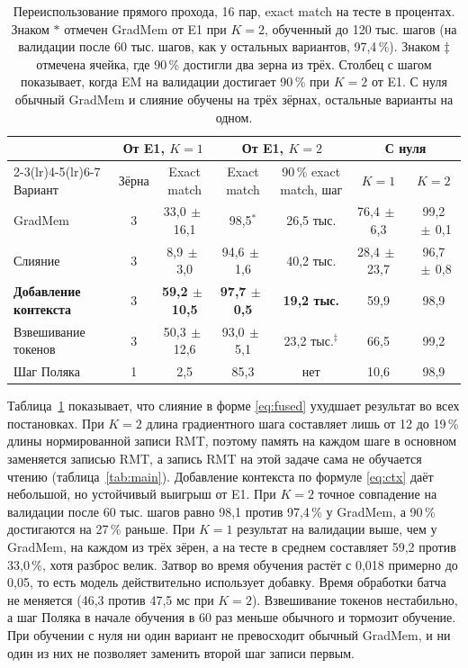 \documentclass[a4paper,11pt]{article}
\newcommand{\pmm}{\ensuremath{\,\pm\,}}
\begin{document}
\begin{table}[t]
\centering\footnotesize
\caption{Переиспользование прямого прохода, 16 пар, exact match на тесте в процентах. Знаком $\ast$ отмечен GradMem от E1 при $K=2$, обученный до 120 тыс. шагов (на валидации после 60 тыс. шагов, как у остальных вариантов, 97,4\,\%). Знаком $\ddagger$ отмечена ячейка, где 90\,\% достигли два зерна из трёх. Столбец с шагом показывает, когда EM на валидации достигает 90\,\% при $K=2$ от E1. С нуля обычный GradMem и слияние обучены на трёх зёрнах, остальные варианты на одном.}
\label{tab:fwd}
\begin{tabular}{l c c c c c c}
\toprule
& \multicolumn{2}{c}{От E1, $K=1$} & \multicolumn{2}{c}{От E1, $K=2$} & \multicolumn{2}{c}{С нуля} \\
\cmidrule(lr){2-3}\cmidrule(lr){4-5}\cmidrule(lr){6-7}
Вариант & Зёрна & Exact match & Exact match & 90\,\% exact match, шаг & $K=1$ & $K=2$ \\
\midrule
GradMem & 3 & 33,0\pmm16,1 & 98,5$^\ast$ & 26,5 тыс. & 76,4\pmm6,3 & 99,2\pmm0,1 \\
Слияние & 3 & 8,9\pmm3,0 & 94,6\pmm1,6 & 40,2 тыс. & 28,4\pmm23,7 & 96,7\pmm0,8 \\
\textbf{Добавление контекста} & 3 & \textbf{59,2\pmm10,5} & \textbf{97,7\pmm0,5} & \textbf{19,2 тыс.} & 59,9 & 98,9 \\
Взвешивание токенов & 3 & 50,3\pmm12,6 & 93,0\pmm5,1 & 23,2 тыс.$^\ddagger$ & 66,5 & 99,2 \\
Шаг Поляка & 1 & 2,5 & 85,3 & нет & 10,6 & 98,9 \\
\bottomrule
\end{tabular}
\end{table}

Таблица~\ref{tab:fwd} показывает, что слияние в форме \eqref{eq:fused} ухудшает результат во всех постановках. При $K=2$ длина градиентного шага составляет лишь от 12 до 19\,\% длины нормированной записи RMT, поэтому память на каждом шаге в основном заменяется записью RMT, а запись RMT на этой задаче сама не обучается чтению (таблица~\ref{tab:main}). Добавление контекста по формуле \eqref{eq:ctx} даёт небольшой, но устойчивый выигрыш от E1. При $K=2$ точное совпадение на валидации после 60 тыс. шагов равно 98,1 против 97,4\,\% у GradMem, а 90\,\% достигаются на 27\,\% раньше. При $K=1$ результат на валидации выше, чем у GradMem, на каждом из трёх зёрен, а на тесте в среднем составляет 59,2 против 33,0\,\%, хотя разброс велик. Затвор во время обучения растёт с 0,018 примерно до 0,05, то есть модель действительно использует добавку. Время обработки батча не меняется (46,3 против 47,5 мс при $K=2$). Взвешивание токенов нестабильно, а шаг Поляка в начале обучения в 60 раз меньше обычного и тормозит обучение. При обучении с нуля ни один вариант не превосходит обычный GradMem, и ни один из них не позволяет заменить второй шаг записи первым.
\end{document}
